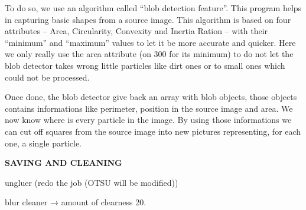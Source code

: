 	To do so, we use an algorithm called “blob detection feature”. This program helps in capturing basic shapes from a source image. This algorithm is based on four attributes – Area, Circularity, Convexity and Inertia Ration – with their “minimum” and “maximum” values to let it be more accurate and quicker. Here we only really use the area attribute (on 300 for its minimum) to do not let the blob detector takes wrong little particles like dirt ones or to small ones which could not be processed.
	
	Once done, the blob detector give back an array with blob objects, those objects contains informations like perimeter, position in the source image and area. We now know where is every particle in the image. By using those informations we can cut off squares from the source image into new pictures representing, for each one, a single particle.

\textbf{SAVING AND CLEANING}

ungluer (redo the job (OTSU will be modified))

blur cleaner → amount of clearness 20.
    
    